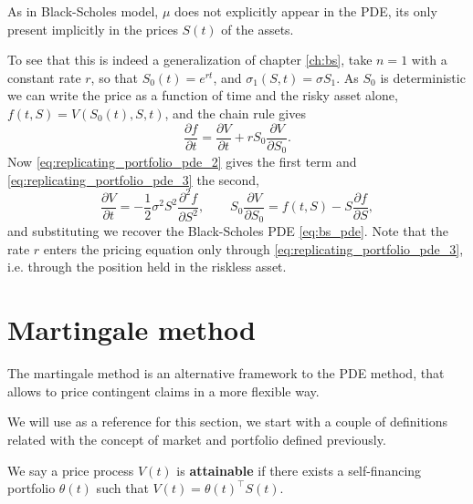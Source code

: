 As in Black-Scholes model,
$\mu$ does not explicitly appear in the PDE,
its only present implicitly in the prices $S(t)$ of the assets.

To see that this is indeed a generalization of chapter \ref{ch:bs},
take $n = 1$ with a constant rate $r$, so that $S_0(t) = e^{rt}$, and $\sigma_1(S, t) = \sigma S_1$.
As $S_0$ is deterministic we can write the price as a function of time and the risky asset alone,
$f(t, S) = V(S_0(t), S, t)$, and the chain rule gives
\begin{equation*}
    \frac{\partial f}{\partial t}
        = \frac{\partial V}{\partial t} + r S_0 \frac{\partial V}{\partial S_0}.
\end{equation*}
Now \eqref{eq:replicating_portfolio_pde_2} gives the first term and \eqref{eq:replicating_portfolio_pde_3} the second,
\begin{equation*}
    \frac{\partial V}{\partial t} = - \frac{1}{2} \sigma^2 S^2 \frac{\partial^2 f}{\partial S^2},
    \qquad
    S_0 \frac{\partial V}{\partial S_0} = f(t, S) - S \frac{\partial f}{\partial S},
\end{equation*}
and substituting we recover the Black-Scholes PDE \eqref{eq:bs_pde}.
Note that the rate $r$ enters the pricing equation only through \eqref{eq:replicating_portfolio_pde_3},
i.e. through the position held in the riskless asset.

\section{Martingale method}\label{subsec:martingale_method}

The martingale method is an alternative framework to the PDE method,
that allows to price contingent claims in a more flexible way.

We will use \cite[Ch.~10]{bjork_arbitrage} as a reference for this section,
we start with a couple of definitions related with the concept of market and portfolio defined previously.
\begin{definition}
    We say a price process $V(t)$ is \textbf{attainable} if there exists a self-financing portfolio $\theta(t)$ such that $V(t) = \theta(t)^\intercal S(t)$.
\end{definition}

